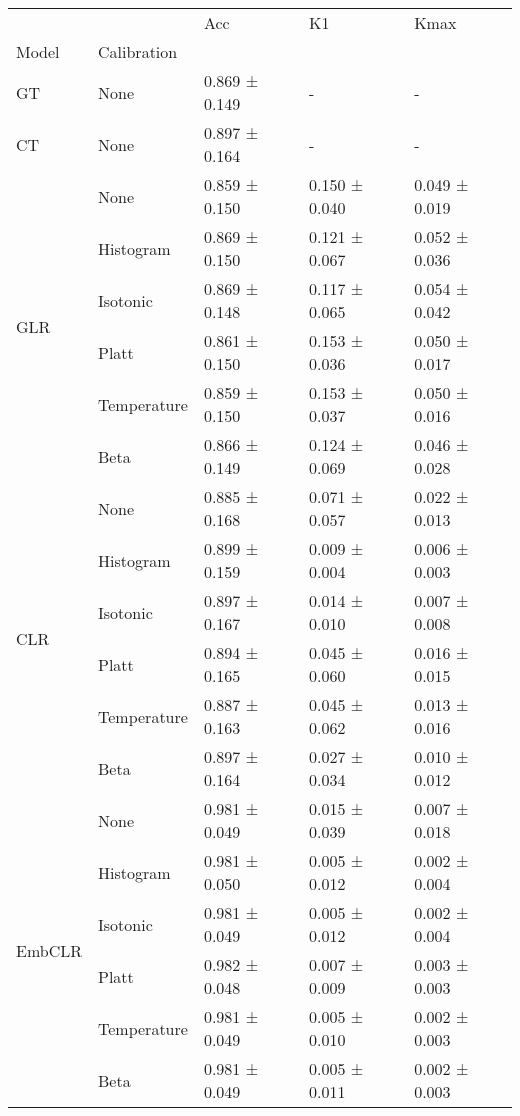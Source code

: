 \begin{tabular}{lllll}
\toprule
 &  & Acc & K1 & Kmax \\
Model & Calibration &  &  &  \\
\midrule
GT & None & 0.869 ± 0.149 & - & - \\
\cline{1-5}
CT & None & 0.897 ± 0.164 & - & - \\
\cline{1-5}
\multirow[t]{6}{*}{GLR} & None & 0.859 ± 0.150 & 0.150 ± 0.040 & 0.049 ± 0.019 \\
 & Histogram & 0.869 ± 0.150 & 0.121 ± 0.067 & 0.052 ± 0.036 \\
 & Isotonic & 0.869 ± 0.148 & 0.117 ± 0.065 & 0.054 ± 0.042 \\
 & Platt & 0.861 ± 0.150 & 0.153 ± 0.036 & 0.050 ± 0.017 \\
 & Temperature & 0.859 ± 0.150 & 0.153 ± 0.037 & 0.050 ± 0.016 \\
 & Beta & 0.866 ± 0.149 & 0.124 ± 0.069 & 0.046 ± 0.028 \\
\cline{1-5}
\multirow[t]{6}{*}{CLR} & None & 0.885 ± 0.168 & 0.071 ± 0.057 & 0.022 ± 0.013 \\
 & Histogram & 0.899 ± 0.159 & 0.009 ± 0.004 & 0.006 ± 0.003 \\
 & Isotonic & 0.897 ± 0.167 & 0.014 ± 0.010 & 0.007 ± 0.008 \\
 & Platt & 0.894 ± 0.165 & 0.045 ± 0.060 & 0.016 ± 0.015 \\
 & Temperature & 0.887 ± 0.163 & 0.045 ± 0.062 & 0.013 ± 0.016 \\
 & Beta & 0.897 ± 0.164 & 0.027 ± 0.034 & 0.010 ± 0.012 \\
\cline{1-5}
\multirow[t]{6}{*}{EmbCLR} & None & 0.981 ± 0.049 & 0.015 ± 0.039 & 0.007 ± 0.018 \\
 & Histogram & 0.981 ± 0.050 & 0.005 ± 0.012 & 0.002 ± 0.004 \\
 & Isotonic & 0.981 ± 0.049 & 0.005 ± 0.012 & 0.002 ± 0.004 \\
 & Platt & 0.982 ± 0.048 & 0.007 ± 0.009 & 0.003 ± 0.003 \\
 & Temperature & 0.981 ± 0.049 & 0.005 ± 0.010 & 0.002 ± 0.003 \\
 & Beta & 0.981 ± 0.049 & 0.005 ± 0.011 & 0.002 ± 0.003 \\
\cline{1-5}
\bottomrule
\end{tabular}
